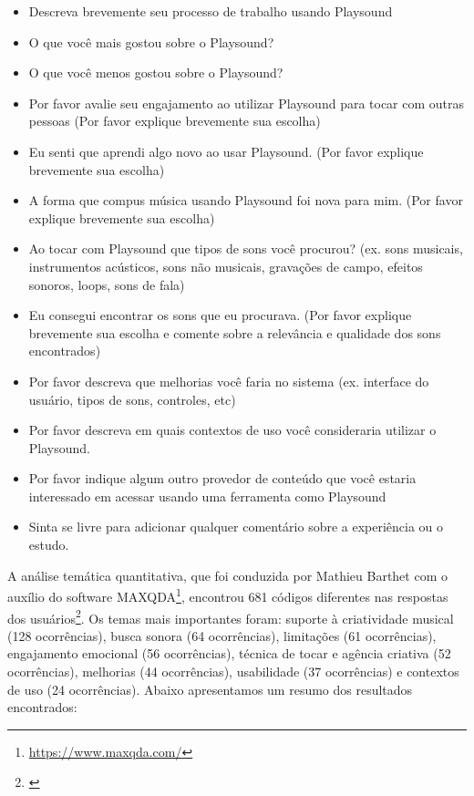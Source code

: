 \begin{itemize}

\item Descreva brevemente seu processo de trabalho usando Playsound

\item O que você mais gostou sobre o Playsound?

\item O que você menos gostou sobre o Playsound?

\item Por favor avalie seu engajamento ao utilizar Playsound para tocar com outras pessoas (Por favor explique brevemente sua escolha)

\item Eu senti que aprendi algo novo ao usar Playsound. (Por favor explique brevemente sua escolha)

\item A forma que compus música usando Playsound foi nova para mim. (Por favor explique brevemente sua escolha)

\item Ao tocar com Playsound que tipos de sons você procurou? (ex. sons musicais, instrumentos acústicos, sons não musicais, gravações de campo, efeitos sonoros, loops, sons de fala)

\item Eu consegui encontrar os sons que eu procurava. (Por favor explique brevemente sua escolha e comente sobre a relevância e qualidade dos sons encontrados)

\item Por favor descreva que melhorias você faria no sistema (ex. interface do usuário, tipos de sons, controles, etc)

\item Por favor descreva em quais contextos de uso você consideraria utilizar o Playsound.

\item Por favor indique algum outro provedor de conteúdo que você estaria interessado em acessar usando uma ferramenta como Playsound

\item Sinta se livre para adicionar qualquer comentário sobre a experiência ou o estudo.

\end{itemize}

A análise temática quantitativa, que foi conduzida por Mathieu Barthet com o auxílio do software MAXQDA\footnote{\url{https://www.maxqda.com/}}, encontrou 681 códigos diferentes nas respostas dos usuários\footnote{\cite{Barthet2018}}. Os temas mais importantes foram: suporte à criatividade musical (128 ocorrências), busca sonora (64 ocorrências), limitações (61 ocorrências), engajamento emocional (56 ocorrências), técnica de tocar e agência criativa (52 ocorrências), melhorias (44 ocorrências), usabilidade (37 ocorrências) e contextos de uso (24 ocorrências). Abaixo apresentamos um resumo dos resultados encontrados:

